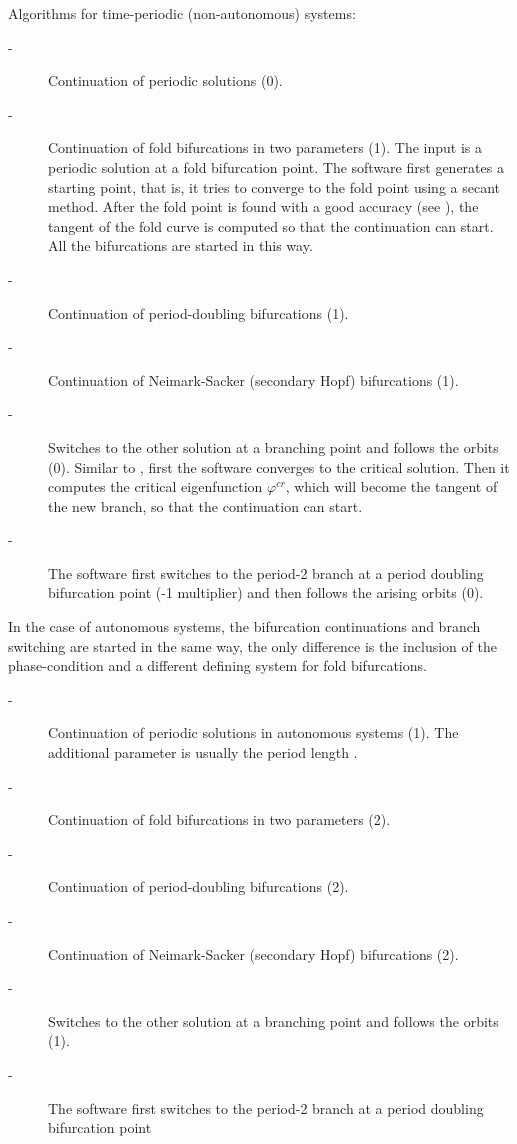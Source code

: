 \documentclass[10pt,a4paper]{ddedoc}
\begin{document}
\begin{description}
Algorithms for time-periodic (non-autonomous) systems:
\begin{description}
\item[ -] Continuation of periodic solutions (0).
%
\item[ -] Continuation of fold bifurcations in two parameters (1). The input is a periodic solution at a fold bifurcation point. The software first generates a starting point, that is, it tries to converge to the fold point using a secant method. After the fold point is found with a good accuracy (see ), the tangent of the fold curve is computed so that the continuation can start. All the bifurcations are started in this way.
%
\item[ -] Continuation of period-doubling bifurcations (1).
%
\item[ -] Continuation of Neimark-Sacker (secondary Hopf) bifurcations (1).
%
\item[ -] Switches to the other solution at a branching point and follows the orbits (0). Similar to , first the software converges to the critical solution. Then it computes the critical eigenfunction $\varphi^{cr}$, which will become the tangent of the new branch, so that the continuation can start.
%
\item[ -] The software first switches to the period-2 branch at a period doubling bifurcation point
(-1 multiplier) and then follows the arising orbits (0).
\end{description}
In the case of autonomous systems, the bifurcation continuations and branch switching are started in the same way, the only difference is the inclusion of the phase-condition and a different defining system for fold bifurcations.
\begin{description}
\item[ -] Continuation of periodic solutions in autonomous systems (1). The additional parameter is usually the period length .
%
\item[ -] Continuation of fold bifurcations in two parameters (2).
%
\item[ -] Continuation of period-doubling bifurcations (2).
%
\item[ -] Continuation of Neimark-Sacker (secondary Hopf) bifurcations (2).
%
\item[ -] Switches to the other solution at a branching point and follows the orbits (1).
%
\item[ -] The software first switches to the period-2 branch at a period doubling bifurcation point

\end{description}
\end{description}
\end{document}
